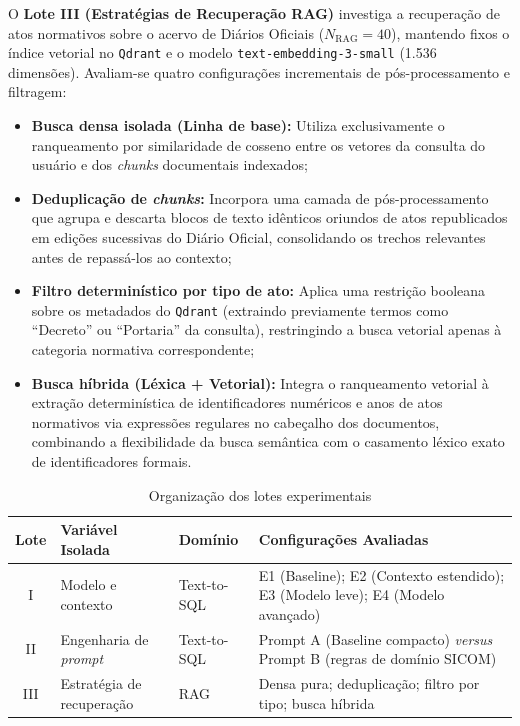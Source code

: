 \documentclass[12pt]{article}
\begin{document}
O \textbf{Lote III (Estratégias de Recuperação RAG)} investiga a recuperação de atos normativos sobre o acervo de Diários Oficiais ($N_{\text{RAG}} = 40$), mantendo fixos o índice vetorial no \texttt{Qdrant} e o modelo \texttt{text-embedding-3-small} (1.536 dimensões). Avaliam-se quatro configurações incrementais de pós-processamento e filtragem:
\begin{itemize}
    \item \textbf{Busca densa isolada (Linha de base):} Utiliza exclusivamente o ranqueamento por similaridade de cosseno entre os vetores da consulta do usuário e dos \textit{chunks} documentais indexados;
    \item \textbf{Deduplicação de \textit{chunks}:} Incorpora uma camada de pós-processamento que agrupa e descarta blocos de texto idênticos oriundos de atos republicados em edições sucessivas do Diário Oficial, consolidando os trechos relevantes antes de repassá-los ao contexto;
    \item \textbf{Filtro determinístico por tipo de ato:} Aplica uma restrição booleana sobre os metadados do \texttt{Qdrant} (extraindo previamente termos como ``Decreto'' ou ``Portaria'' da consulta), restringindo a busca vetorial apenas à categoria normativa correspondente;
    \item \textbf{Busca híbrida (Léxica + Vetorial):} Integra o ranqueamento vetorial à extração determinística de identificadores numéricos e anos de atos normativos via expressões regulares no cabeçalho dos documentos, combinando a flexibilidade da busca semântica com o casamento léxico exato de identificadores formais.
\end{itemize}

\begin{table}[htbp]
\centering
\caption{Organização dos lotes experimentais}
\label{tab:lotes}
\small
\begin{tabular}{cllp{6.6cm}}
\toprule
\textbf{Lote} & \textbf{Variável Isolada} & \textbf{Domínio} & \textbf{Configurações Avaliadas} \\
\midrule
I & Modelo e contexto & Text-to-SQL & E1 (Baseline); E2 (Contexto estendido); E3 (Modelo leve); E4 (Modelo avançado) \\
II & Engenharia de \textit{prompt} & Text-to-SQL & Prompt A (Baseline compacto) \textit{versus} Prompt B (regras de domínio SICOM) \\
III & Estratégia de recuperação & RAG & Densa pura; deduplicação; filtro por tipo; busca híbrida \\
\bottomrule
\end{tabular}
\end{table}
\end{document}
